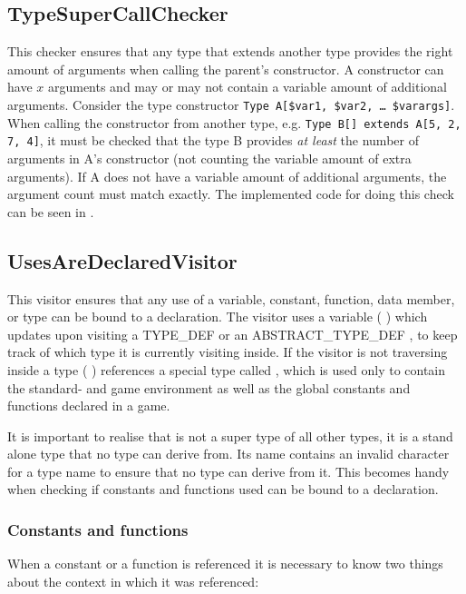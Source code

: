 \subsection{TypeSuperCallChecker}
This checker ensures that any type that extends another type provides the right
amount of arguments when calling the parent's constructor. A constructor can have
$x$ arguments and may or may not contain a variable amount of additional
arguments. Consider the type constructor \texttt{Type A[\$var1, \$var2, \dots
\$varargs]}. When calling the constructor from another type, e.g. \texttt{Type
B[] extends A[5, 2, 7, 4]}, it must be checked that the type B provides \textit{at
least} the number of arguments in A's constructor (not counting the variable
amount of extra arguments). If A does not have a variable amount of additional
arguments, the argument count must match exactly. The implemented code for doing
this check can be seen in .



\subsection{UsesAreDeclaredVisitor}
\label{sec:usesaredeclaredvisitor}
This visitor ensures that any use of a variable, constant, function, data
member, or type can be bound to a declaration. The visitor uses a variable
( ) which updates upon visiting a
TYPE\_DEF or an ABSTRACT\_TYPE\_DEF , to keep track of which
type it is currently visiting inside. If the visitor is not traversing inside a
type ( ) references a special type
called , which is used only to contain the standard- and game
environment as well as the global constants and functions declared in a
\productname{} game. 

It is important to realise that  is not a super type of all
other types, it is a stand alone type that no type can derive from. Its name
contains an invalid character for a type name to ensure that no type can derive
from it. This becomes handy when checking if constants and functions used can be
bound to a declaration.

\subsubsection{Constants and functions}
When a constant or a function is referenced it is necessary to know two things
about the context in which it was referenced:

